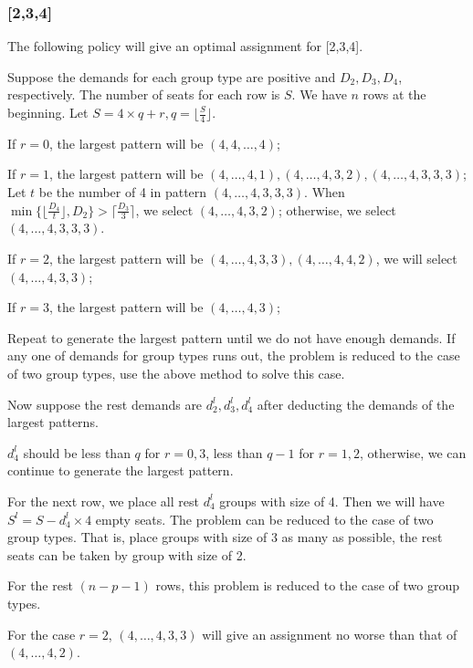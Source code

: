 \subsubsection{[2,3,4]}

\begin{thm}\label{234case}
The following policy will give an optimal assignment for [2,3,4].
\end{thm}

Suppose the demands for each group type are positive and $D_2,D_3,D_4$, respectively. The number of seats for each row is $S$. We have $n$ rows at the beginning. Let $S = 4 \times q +r, q = \lfloor \frac{S}{4} \rfloor$.

If $r = 0$, the largest pattern will be $(4,4,\ldots,4)$;

If $r = 1$, the largest pattern will be $(4,\ldots,4,1),(4,\ldots,4,3,2),(4,\ldots,4,3,3,3)$; Let $t$ be the number of 4 in pattern $(4,\ldots,4,3,3,3)$.
When $\min\{\lfloor \frac{D_4}{t} \rfloor, D_2\} > \lceil \frac{D_3}{3} \rceil$, we select $(4,\ldots,4,3,2)$; otherwise, we select $(4,\ldots,4,3,3,3)$.

If $r = 2$, the largest pattern will be $(4,\ldots,4,3,3),(4,\ldots,4,4,2)$, we will select $(4,\ldots,4,3,3)$;

If $r = 3$, the largest pattern will be $(4,\ldots,4,3)$;

Repeat to generate the largest pattern until we do not have enough demands.
If any one of demands for group types runs out, the problem is reduced to the case of two group types, use the above method to solve this case.

Now suppose the rest demands are $d_2^{l},d_3^{l},d_4^{l}$ after deducting the demands of the largest patterns.

$d_4^{l}$ should be less than $q$ for $r=0,3$, less than $q-1$ for $r=1,2$, otherwise, we can continue to generate the largest pattern.

For the next row, we place all rest $d_4^{l}$ groups with size of 4. Then we will have $S^{l} = S - d_4^{l} \times 4$ empty seats. The problem can be reduced to the case of two group types. That is, place groups with size of 3 as many as possible, the rest seats can be taken by group with size of 2.

For the rest $(n-p-1)$ rows, this problem is reduced to the case of two group types.

\begin{lem}\label{4case}
For the case $r=2$, $(4,\ldots,4,3,3)$ will give an assignment no worse than that of $(4,\ldots,4,2)$.
\end{lem}

